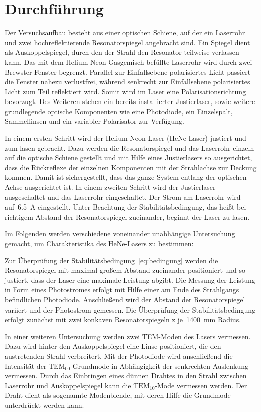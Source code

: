 \section{Durchführung}
\label{sec:durchführung}

Der Versuchsaufbau besteht aus einer optischen Schiene, auf der ein Laserrohr
und zwei hochreflektierende Resonatorspiegel angebracht sind. Ein Spiegel dient
als Auskoppelspiegel, durch den der Strahl den Resonator teilweise
verlassen kann. Das mit dem Helium-Neon-Gasgemisch befüllte Laserrohr wird
durch zwei Brewster-Fenster begrenzt. Parallel zur Einfallsebene polarisiertes
Licht passiert die Fenster nahezu verlustfrei, während senkrecht zur
Einfallsebene polarisiertes Licht zum Teil reflektiert wird. Somit wird im Laser
eine Polarisationsrichtung bevorzugt. Des Weiteren stehen ein bereits
installierter Justierlaser, sowie weitere grundlegende optische Komponenten wie
eine Photodiode, ein Einzelspalt, Sammellinsen und ein variabler Polarisator zur Verfügung.

In einem ersten Schritt wird der Helium-Neon-Laser (HeNe-Laser) justiert und zum
lasen gebracht. Dazu werden die Resonatorspiegel und das Laserrohr einzeln auf
die optische Schiene gestellt und mit Hilfe eines Justierlasers so ausgerichtet,
dass die Rückreflexe der einzelnen Komponenten mit der Strahlachse zur Deckung
kommen. Damit ist sichergestellt, dass das ganze System entlang der optischen
Achse ausgerichtet ist. In einem zweiten Schritt wird der Justierlaser
ausgeschaltet und das Laserrohr eingeschaltet. Der Strom am Laserrohr wird
auf~\SI{6.5}{\ampere} eingestellt. Unter Beachtung der Stabilitätsbedingung,
das heißt bei richtigem Abstand der Resonatorspiegel zueinander, beginnt der
Laser zu lasen.

Im Folgenden werden verschiedene voneinander unabhängige Untersuchung gemacht,
um Charakteristika des HeNe-Lasers zu bestimmen:

Zur Überprüfung der Stabilitätsbedingung~\eqref{eq:bedingung} werden die
Resonatorspiegel mit maximal großem Abstand zueinander positioniert und so
justiert, dass der Laser eine maximale Leistung abgibt. Die Messung der
Leistung in Form eines Photostromes erfolgt mit Hilfe einer am Ende des
Strahlgangs befindlichen Photodiode. Anschließend wird der Abstand der
Resonatorspiegel variiert und der Photostrom gemessen. Die Überprüfung der
Stabilitätsbedingung erfolgt zunächst mit zwei konkaven Resonatorspiegeln z
je~\SI{1400}{\milli\metre} Radius.

In einer weiteren Untersuchung werden zwei TEM-Moden des Lasers vermessen.
Dazu wird hinter den Auskoppelspiegel eine Linse positioniert, die den
austretenden Strahl verbreitert. Mit der Photodiode wird anschließend die
Intensität der $\text{TEM}_{00}$-Grundmode in Abhängigkeit der senkrechten
Auslenkung vermessen. Durch das Einbringen eines dünnen Drahtes in den Strahl
zwischen Laserrohr und Auskoppelspiegel kann die $\text{TEM}_{10}$-Mode
vermessen werden. Der Draht dient als sogenannte Modenblende, mit deren Hilfe die
Grundmode unterdrückt werden kann.

